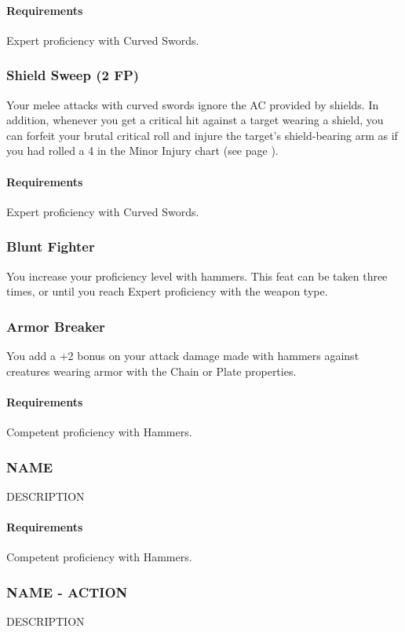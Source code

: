     \paragraph{Requirements} Expert proficiency with Curved Swords.
\subsubsection{Shield Sweep (2 FP)} \label{feat::shieldsweep}
    Your melee attacks with curved swords ignore the AC provided by shields.
    In addition, whenever you get a critical hit against a target wearing a shield, you can forfeit your brutal critical roll and injure the target's shield-bearing arm as if you had rolled a 4 in the Minor Injury chart (see page \pageref{ssec::injuriesandinsanity}).
    \paragraph{Requirements} Expert proficiency with Curved Swords.
\subsubsection{Blunt Fighter} \label{feat::bluntfighter}
    You increase your proficiency level with hammers.
    This feat can be taken three times, or until you reach Expert proficiency with the weapon type.
\subsubsection{Armor Breaker} \label{feat::armorbreaker}
    You add a +2 bonus on your attack damage made with hammers against creatures wearing armor with the Chain or Plate properties.
    \paragraph{Requirements} Competent proficiency with Hammers.
\subsubsection{NAME} \label{feat::name}
    DESCRIPTION
    \paragraph{Requirements} Competent proficiency with Hammers.
\subsubsection{NAME - ACTION} \label{feat::name}
    DESCRIPTION
